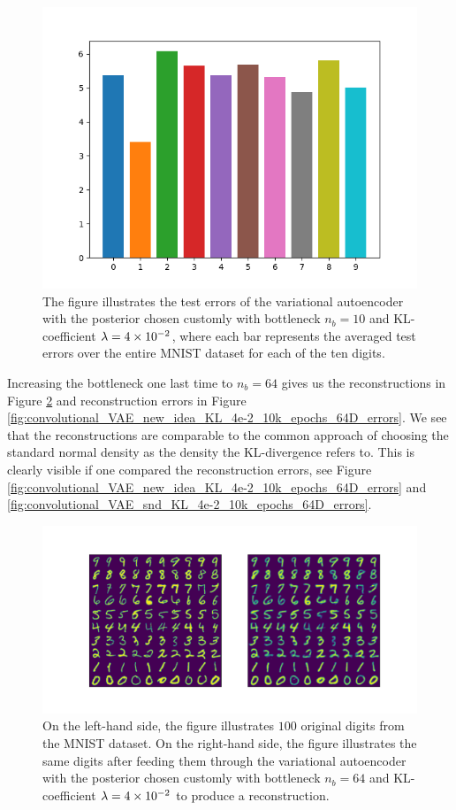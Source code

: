 \begin{figure}
\begin{center}
      \includegraphics[width=0.55\linewidth]{convolutional_VAE_new_idea_KL_4e-2_10k_epochs_10D_errors}
\end{center}
\caption{The figure illustrates the test errors of the variational autoencoder with the posterior chosen customly with bottleneck $n_b=10$ and KL-coefficient $\lambda = \num{4e-2}$, where each bar represents the averaged test errors over the entire MNIST dataset for each of the ten digits.}\label{fig:convolutional_VAE_new_idea_KL_4e-2_10k_epochs_10D_errors}
\end{figure}


Increasing the bottleneck one last time to $n_b=64$ gives us the reconstructions in Figure \ref{fig:convolutional_VAE_new_idea_KL_4e-2_10k_epochs_64D_inference} and reconstruction errors in Figure \ref{fig:convolutional_VAE_new_idea_KL_4e-2_10k_epochs_64D_errors}. We see that the reconstructions are comparable to the common approach of choosing the standard normal density as the density the KL-divergence refers to. This is clearly visible if one compared the reconstruction errors, see Figure \ref{fig:convolutional_VAE_new_idea_KL_4e-2_10k_epochs_64D_errors} and \ref{fig:convolutional_VAE_snd_KL_4e-2_10k_epochs_64D_errors}.


\begin{figure}
\begin{center}
      \includegraphics[trim = 15mm 10mm 15mm 15mm, clip, width=\linewidth]{convolutional_VAE_new_idea_KL_4e-2_10k_epochs_64D_inference}
\end{center}
\caption{On the left-hand side, the figure illustrates $100$ original digits from the MNIST dataset. On the right-hand side, the figure illustrates the same digits after feeding them through the variational autoencoder with the posterior chosen customly with bottleneck $n_b=64$ and KL-coefficient $\lambda=\num{4e-2}$ to produce a reconstruction.}\label{fig:convolutional_VAE_new_idea_KL_4e-2_10k_epochs_64D_inference}
\end{figure}


